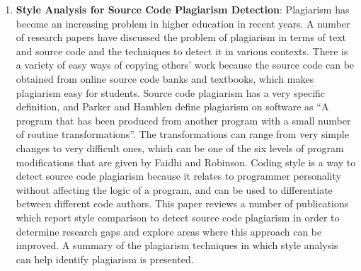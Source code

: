 \begin{englishtext}
\begin{enumerate}
    \item \textbf{Style Analysis for Source Code Plagiarism Detection}:
    Plagiarism has become an increasing problem in higher education in recent
    years. A number of research papers have discussed the problem of plagiarism
    in terms of text and source code and the techniques to detect it in various
    contexts. There is a variety of easy ways of copying others’ work because
    the source code can be obtained from online source code banks and textbooks,
    which makes plagiarism easy for students. Source code plagiarism has a very
    specific definition, and Parker and Hamblen define plagiarism on software as
    “A program that has been produced from another program with a small number
    of routine transformations”. The transformations can range from very simple
    changes to very difficult ones, which can be one of the six levels of
    program modifications that are given by Faidhi and Robinson. Coding style is
    a way to detect source code plagiarism because it relates to programmer
    personality without affecting the logic of a program, and can be used to
    differentiate between different code authors. This paper reviews a number of
    publications which report style comparison to detect source code plagiarism
    in order to determine research gaps and explore areas where this approach
    can be improved. A summary of the plagiarism techniques in which style
    analysis can help identify plagiarism is presented.
    \cite{codePlagiarismDetection}


\end{enumerate}
\end{englishtext}


